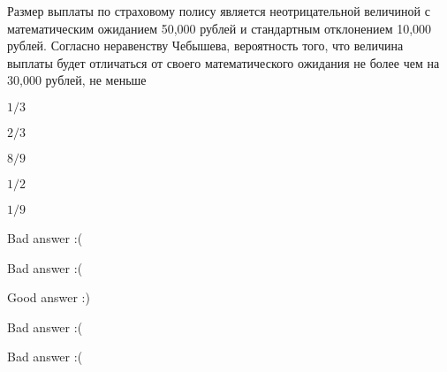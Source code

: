
\begin{question}
Размер выплаты по страховому полису является неотрицательной величиной с
математическим ожиданием 50,000 рублей и стандартным отклонением 10,000
рублей. Согласно неравенству Чебышева, вероятность того, что величина
выплаты будет отличаться от своего математического ожидания не более чем
на 30,000 рублей, не меньше
\begin{answerlist}
  \item \(1/3\)
  \item \(2/3\)
  \item \(8/9\)
  \item \(1/2\)
  \item \(1/9\)
\end{answerlist}
\end{question}

\begin{solution}
\begin{answerlist}
  \item Bad answer :(
  \item Bad answer :(
  \item Good answer :)
  \item Bad answer :(
  \item Bad answer :(
\end{answerlist}
\end{solution}

